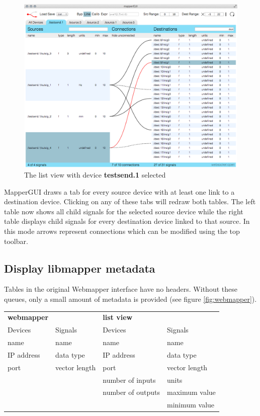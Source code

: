 \begin{figure}[ht]
\centering
	\includegraphics[width=1\textwidth]{figures/list_view_single_link}
\caption{The list view with device \textbf{testsend.1} selected}
\label{fig:list_view_single_link}
\end{figure}

MapperGUI draws a tab for every source device with at least one link to a destination device. Clicking on any of these tabs will redraw both tables. The left table now shows all child signals for the selected source device while the right table displays child signals for every destination device linked to that source. In this mode arrows represent connections which can be modified using the top toolbar.

	
	\subsection{Display libmapper metadata} %
	\label{sub:display_libmapper_metadata}

Tables in the original Webmapper interface have no headers. Without these queues, only a small amount of metadata is provided (see figure \ref{fig:webmapper}).

\begin{table}
	\centering
	\label{tab:webmapper_list_view_metadata}
		\begin{tabular}{l  l  |  l l }
		\hline\hline
		\textbf{webmapper}&&\textbf{list view}\\
		Devices&Signals&Devices&Signals\\
		\hline
		name&name&name&name\\
		IP address&data type&IP address&data type\\
		port&vector length&port&vector length\\
		&&number of inputs&units\\
		&&number of outputs&maximum value\\
		&&&minimum value\\
		\end{tabular}
\end{table}

